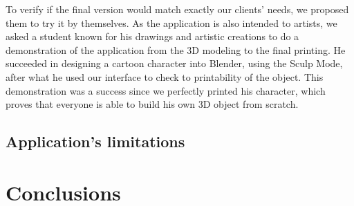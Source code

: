 \documentclass{report}
\begin{document}
To verify if the final version would match exactly our clients' needs, we proposed them to try it by themselves. As the application is also intended to artists, we asked a student known for his drawings and artistic creations to do a demonstration of the application from the 3D modeling to the final printing. He succeeded in designing a cartoon character into Blender, using the Sculp Mode, after what he used our interface to check to printability of the object. This demonstration was a success since we perfectly printed his character, which proves that everyone is able to build his own 3D object from scratch.

\section{Application's limitations}

\chapter{Conclusions}





\appendix
\end{document}
